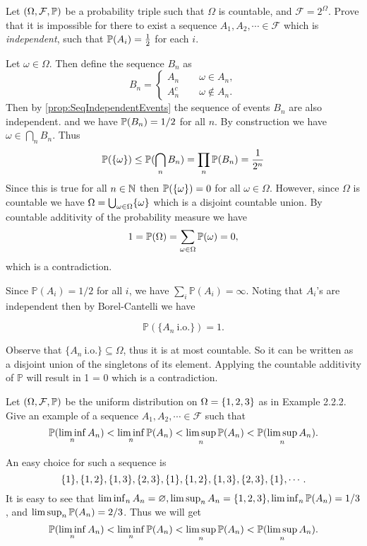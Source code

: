\begin{problem}
	Let $ (\Omega, \mathcal{F},\mathbb{P}) $ be a probability triple such that $ \Omega $ is countable, and $ \mathcal{F} = 2^\Omega $. Prove that it is impossible for there to exist a sequence $ A_1,A_2,\cdots \in \mathcal{F} $ which is \emph{independent}, such that $ \mathbb{P}(A_i)=\frac{1}{2} $ for each $ i $.
\end{problem}
\begin{solution}
	Let $ \omega \in \Omega $. Then define the sequence $ B_n $ as 
	\[ B_n = \begin{cases}
		A_n \qquad \omega \in A_n, \\
		A_n^c \qquad \omega \notin A_n.
	\end{cases} \]
	Then by \autoref{prop:SeqIndependentEvents} the sequence of events $ B_n $ are also independent. and we have $ \mathbb{P}(B_n)=1/2 $ for all $ n $. By construction we have $ \omega \in \bigcap_n B_n $. Thus 
	\[ \mathbb{P}(\{\omega\}) \leq \mathbb{P}(\bigcap_n B_n) = \prod_n \mathbb{P}(B_n) = \frac{1}{2^n} \]
	Since this is true for all $ n \in \mathbb{N} $ then $ \mathbb{P}(\{\omega\}) = 0 $ for all $ \omega \in \Omega $. However, since $ \Omega $ is countable we have $ \Omega = \bigcup_{\omega \in \Omega}\{\omega\} $ which is a disjoint countable union. By countable additivity of the probability measure we have
	\[ 1 = \mathbb{P}(\Omega) = \sum_{\omega\in\Omega}\mathbb{P}(\omega) = 0,  \]
	which is a contradiction.
\end{solution}
\begin{solution}
	Since $\mathbb{P}(A_i) = 1/2$ for all $i$, we have $\sum_i \mathbb{P}(A_i) = \infty$. Noting that $A_i$'s are independent then by Borel-Cantelli we have
	
	$$ \mathbb{P}(\{ A_n \ \text{i.o.} \}) = 1.$$
	
	Observe that $ \{ A_n \ \text{i.o.} \} \subseteq \Omega $, thus it is at most countable. So it can be written as a disjoint union of the singletons of its element. Applying the countable additivity of $\mathbb{P}$ will result in 1 = 0 which is a contradiction.
\end{solution}

\begin{problem}
	Let $ (\Omega,\mathcal{F},\mathbb{P}) $ be the uniform distribution on $ \Omega = \{1,2,3\} $ as in Example 2.2.2. Give an example of a sequence $ A_1,A_2,\cdots\in\mathcal{F} $ such that 
	\[ \mathbb{P}(\liminf_n A_n) < \liminf_n \mathbb{P}(A_n) < \limsup_n \mathbb{P}(A_n) < \mathbb{P}(\limsup_n A_n). \]
\end{problem}
\begin{solution}
	An easy choice for such a sequence is 
	\[ \{1\},\{1,2\},\{1,3\},\{2,3\},\{1\},\{1,2\},\{1,3\},\{2,3\},\{1\},\cdots. \]
	It is easy to see that $ \liminf_n A_n = \varnothing, \limsup_n A_n = \{1,2,3\}, \liminf_n \mathbb{P}(A_n) = 1/3$, and $ \limsup_n \mathbb{P}(A_n) = 2/3 $. Thus we will get
	\[ \mathbb{P}(\liminf_n A_n) < \liminf_n \mathbb{P}(A_n) < \limsup_n \mathbb{P}(A_n) < \mathbb{P}(\limsup_n A_n). \]
\end{solution}

